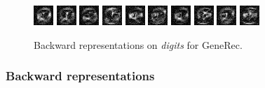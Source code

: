 \begin{figure}[H]
  \centering
  \includegraphics{../presentation/img/dig_0.png} %
  \includegraphics{../presentation/img/dig_1.png} 
  \includegraphics{../presentation/img/dig_2.png} 
  \includegraphics{../presentation/img/dig_3.png} 
  \includegraphics{../presentation/img/dig_4.png} 
  \includegraphics{../presentation/img/dig_5.png} 
  \includegraphics{../presentation/img/dig_6.png} 
  \includegraphics{../presentation/img/dig_7.png} 
  \includegraphics{../presentation/img/dig_8.png} 
  \includegraphics{../presentation/img/dig_9.png} 
  \caption{Backward representations on \emph{digits} for GeneRec.}
  \label{fig:results-backward-repre-generec}
\end{figure}


\subsubsection{Backward representations} 

